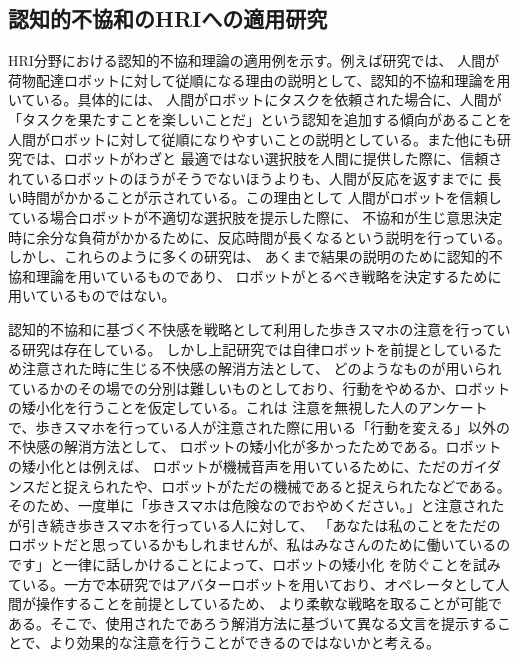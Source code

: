 \documentclass{kuisthesis}
\begin{document}
\subsection{認知的不協和のHRIへの適用研究}
HRI分野における認知的不協和理論の適用例を示す。例えば研究\cite{washburn2022exploring}では、
人間が荷物配達ロボットに対して従順になる理由の説明として、認知的不協和理論を用いている。具体的には、
人間がロボットにタスクを依頼された場合に、人間が「タスクを果たすことを楽しいことだ」という認知を追加する傾向があることを
人間がロボットに対して従順になりやすいことの説明としている。また他にも研究\cite{herse2018you}では、ロボットがわざと
最適ではない選択肢を人間に提供した際に、信頼されているロボットのほうがそうでないほうよりも、人間が反応を返すまでに
長い時間がかかることが示されている。この理由として
人間がロボットを信頼している場合ロボットが不適切な選択肢を提示した際に、
不協和が生じ意思決定時に余分な負荷がかかるために、反応時間が長くなるという説明を行っている。
しかし、これらのように多くの研究は、
あくまで結果の説明のために認知的不協和理論を用いているものであり、
ロボットがとるべき戦略を決定するために用いているものではない。

認知的不協和に基づく不快感を戦略として利用した歩きスマホの注意を行っている研究は存在している\cite{Schneider2022}。
しかし上記研究では自律ロボットを前提としているため注意された時に生じる不快感の解消方法として、
どのようなものが用いられているかのその場での分別は難しいものとしており、行動をやめるか、ロボットの矮小化を行うことを仮定している。これは
注意を無視した人のアンケートで、歩きスマホを行っている人が注意された際に用いる「行動を変える」以外の不快感の解消方法として、
ロボットの矮小化が多かったためである。ロボットの矮小化とは例えば、
ロボットが機械音声を用いているために、ただのガイダンスだと捉えられたや、ロボットがただの機械であると捉えられたなどである。
そのため、一度単に「歩きスマホは危険なのでおやめください。」と注意されたが引き続き歩きスマホを行っている人に対して、
「あなたは私のことをただのロボットだと思っているかもしれませんが、私はみなさんのために働いているのです」と一律に話しかけることによって、ロボットの矮小化
を防ぐことを試みている。一方で本研究ではアバターロボットを用いており、オペレータとして人間が操作することを前提としているため、
より柔軟な戦略を取ることが可能である。そこで、使用されたであろう解消方法に基づいて異なる文言を提示することで、より効果的な注意を行うことができるのではないかと考える。
\end{document}
